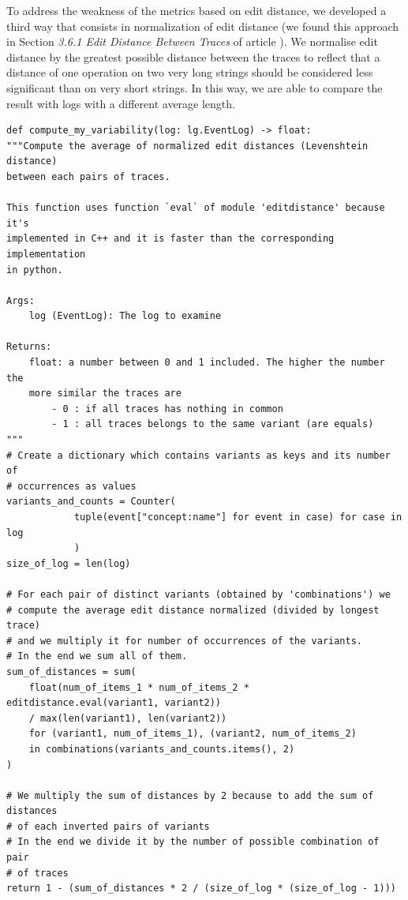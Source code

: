 \documentclass[12pt]{article}
\newenvironment{code}{\captionsetup{type=listing}}{}
\begin{document}
To address the weakness of the metrics based on edit distance, we developed a third way that consists in normalization of edit distance (we found this approach in Section \textit{3.6.1 Edit Distance Between Traces} of article \cite{ARTICLE:1}).  We normalise edit distance by the greatest possible distance between the traces to reflect that a distance of one operation on two very long strings should be considered less significant than on very short strings. In this way, we are able to compare the result with logs with a different average length.
\begin{code}
	\label{code:code3}
	\begin{verbatim}
def compute_my_variability(log: lg.EventLog) -> float:
"""Compute the average of normalized edit distances (Levenshtein distance)
between each pairs of traces.

This function uses function `eval` of module 'editdistance' because it's
implemented in C++ and it is faster than the corresponding implementation
in python.

Args:
	log (EventLog): The log to examine

Returns:
	float: a number between 0 and 1 included. The higher the number the
	more similar the traces are
		- 0 : if all traces has nothing in common
		- 1 : all traces belongs to the same variant (are equals)
"""
# Create a dictionary which contains variants as keys and its number of
# occurrences as values
variants_and_counts = Counter(
			tuple(event["concept:name"] for event in case) for case in log
			)
size_of_log = len(log)

# For each pair of distinct variants (obtained by 'combinations') we
# compute the average edit distance normalized (divided by longest trace)
# and we multiply it for number of occurrences of the variants.
# In the end we sum all of them.
sum_of_distances = sum(
	float(num_of_items_1 * num_of_items_2 * editdistance.eval(variant1, variant2))
	/ max(len(variant1), len(variant2))
	for (variant1, num_of_items_1), (variant2, num_of_items_2)
	in combinations(variants_and_counts.items(), 2)
)

# We multiply the sum of distances by 2 because to add the sum of distances
# of each inverted pairs of variants
# In the end we divide it by the number of possible combination of pair
# of traces
return 1 - (sum_of_distances * 2 / (size_of_log * (size_of_log - 1)))
	\end{verbatim}
\end{code}
\end{document}
